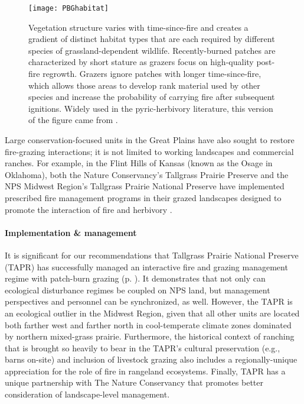\begin{figure}[!b]
	\center
	\texttt{[image: PBGhabitat]}
	\caption[Vegetation structure, grassland birds, and the fire-grazing interaction]
	{Vegetation structure varies with time-since-fire and creates a gradient of distinct habitat types that are each required by different species of grassland-dependent wildlife. 
	Recently-burned patches are characterized by short stature as grazers focus on high-quality post-fire regrowth. 
	Grazers ignore patches with longer time-since-fire, which allows those areas to develop rank material used by other species and increase the probability of carrying fire after subsequent ignitions.
	Widely used in the pyric-herbivory literature, this version of the figure came from \citet{fuhlendorf2009}.}
	\label{fig:habitat}
\end{figure}

Large conservation-focused units in the Great Plains have also sought to restore fire-grazing interactions; it is not limited to working landscapes and commercial ranches. 
For example, in the Flint Hills of Kansas (known as the Osage in Oklahoma), both the Nature Conservancy's Tallgrass Prairie Preserve and the NPS Midwest Region's Tallgrass Prairie National Preserve have implemented prescribed fire management programs in their grazed landscapes designed to promote the interaction of fire and herbivory \citep{hamilton2007, leis2013}. 

\paragraph{Implementation \& management}

It is significant for our recommendations that Tallgrass Prairie National Preserve (TAPR) has successfully managed an interactive fire and grazing management regime with patch-burn grazing (p.  \pageref{ref:TAPR_PBG}). 
It demonstrates that not only can ecological disturbance regimes be coupled on NPS land, but management perspectives and personnel can be synchronized, as well. 
However, the TAPR is an ecological outlier in the Midwest Region, given that all other units are located both farther west and farther north in cool-temperate climate zones dominated by northern mixed-grass prairie. 
Furthermore, the historical context of ranching that is brought so heavily to bear in the TAPR's cultural preservation (e.g., barns on-site) and inclusion of livestock grazing also includes a regionally-unique appreciation for the role of fire in rangeland ecosystems. 
Finally, TAPR has a unique partnership with The Nature Conservancy that promotes better consideration of landscape-level management. 

